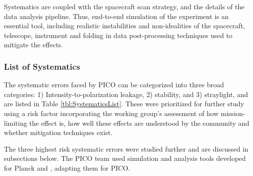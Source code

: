 \documentclass[PICOReport.tex]{subfiles}
\begin{document}
Systematics are coupled with the
spacecraft scan strategy, and the details of the 
data analysis pipeline.
Thus, end-to-end simulation of the experiment is an essential tool,
including realistic instabilities and non-idealities of the spacecraft,
telescope, instrument and folding in data post-processing techniques
used to mitigate the effects.    

\subsubsection{List of Systematics}
The systematic errors faced by PICO can be categorized into three broad categories: 
1) Intensity-to-polarization leakage, 2) stability, and 3) straylight, and are listed in Table \ref{tbl:SystematicsList}.  
These were prioritized for further study using a risk factor incorporating the working group's assessment of how mission-limiting the effect is, how well these effects are understood by the community and whether mitigation techniques exist.  

The three highest risk systematic errors were studied further and are discussed in subsections below.  The PICO team used 
 simulation and analysis tools developed for Planck\cite{plank2015_xii_focalplane} and \core, adapting them for PICO.

\end{document}
